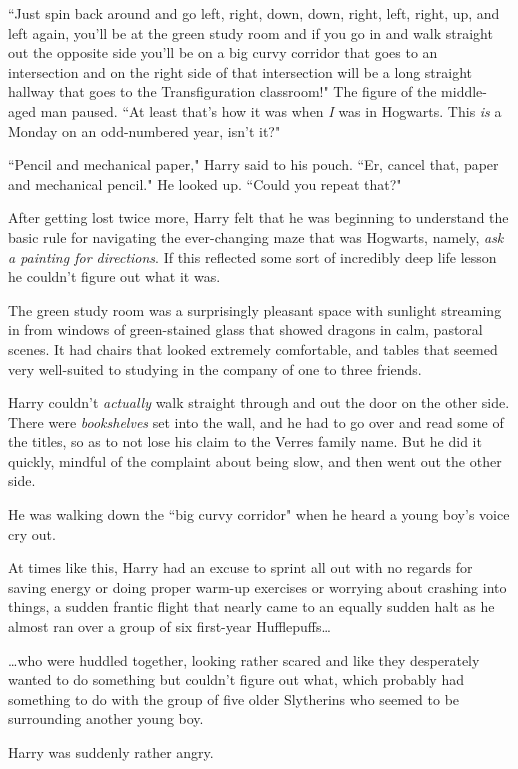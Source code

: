 ``Just spin back around and go left, right, down, down, right, left, right, up, and left again, you'll be at the green study room and if you go in and walk straight out the opposite side you'll be on a big curvy corridor that goes to an intersection and on the right side of that intersection will be a long straight hallway that goes to the Transfiguration classroom!" The figure of the middle-aged man paused. ``At least that's how it was when \emph{I} was in Hogwarts. This \emph{is} a Monday on an odd-numbered year, isn't it?"

``Pencil and mechanical paper," Harry said to his pouch. ``Er, cancel that, paper and mechanical pencil." He looked up. ``Could you repeat that?"

After getting lost twice more, Harry felt that he was beginning to understand the basic rule for navigating the ever-changing maze that was Hogwarts, namely, \emph{ask a painting for directions}. If this reflected some sort of incredibly deep life lesson he couldn't figure out what it was.

The green study room was a surprisingly pleasant space with sunlight streaming in from windows of green-stained glass that showed dragons in calm, pastoral scenes. It had chairs that looked extremely comfortable, and tables that seemed very well-suited to studying in the company of one to three friends.

Harry couldn't \emph{actually} walk straight through and out the door on the other side. There were \emph{bookshelves} set into the wall, and he had to go over and read some of the titles, so as to not lose his claim to the Verres family name. But he did it quickly, mindful of the complaint about being slow, and then went out the other side.

He was walking down the ``big curvy corridor" when he heard a young boy's voice cry out.

At times like this, Harry had an excuse to sprint all out with no regards for saving energy or doing proper warm-up exercises or worrying about crashing into things, a sudden frantic flight that nearly came to an equally sudden halt as he almost ran over a group of six first-year Hufflepuffs{\ldots}

{\ldots}who were huddled together, looking rather scared and like they desperately wanted to do something but couldn't figure out what, which probably had something to do with the group of five older Slytherins who seemed to be surrounding another young boy.

Harry was suddenly rather angry.

